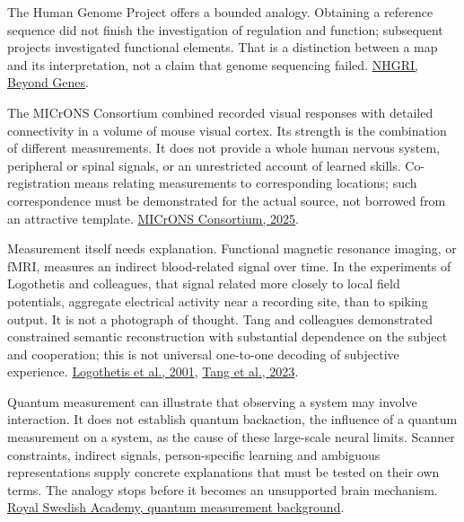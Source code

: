 The Human Genome Project offers a bounded analogy. Obtaining a reference sequence did not finish the investigation of regulation and function; subsequent projects investigated functional elements. That is a distinction between a map and its interpretation, not a claim that genome sequencing failed. \href{https://www.genome.gov/11009066/2003-release-scientists-venture-deeper-into-the-human-genome}{NHGRI, Beyond Genes}.\par

The MICrONS Consortium combined recorded visual responses with detailed connectivity in a volume of mouse visual cortex. Its strength is the combination of different measurements. It does not provide a whole human nervous system, peripheral or spinal signals, or an unrestricted account of learned skills. Co-registration means relating measurements to corresponding locations; such correspondence must be demonstrated for the actual source, not borrowed from an attractive template. \href{https://www.nature.com/articles/s41586-025-08790-w}{MICrONS Consortium, 2025}.\par

Measurement itself needs explanation. Functional magnetic resonance imaging, or fMRI, measures an indirect blood-related signal over time. In the experiments of Logothetis and colleagues, that signal related more closely to local field potentials, aggregate electrical activity near a recording site, than to spiking output. It is not a photograph of thought. Tang and colleagues demonstrated constrained semantic reconstruction with substantial dependence on the subject and cooperation; this is not universal one-to-one decoding of subjective experience. \href{https://pubmed.ncbi.nlm.nih.gov/11449264/}{Logothetis et al., 2001}, \href{https://www.nature.com/articles/s41593-023-01304-9}{Tang et al., 2023}.\par

Quantum measurement can illustrate that observing a system may involve interaction. It does not establish quantum backaction, the influence of a quantum measurement on a system, as the cause of these large-scale neural limits. Scanner constraints, indirect signals, person-specific learning and ambiguous representations supply concrete explanations that must be tested on their own terms. The analogy stops before it becomes an unsupported brain mechanism. \href{https://www.nobelprize.org/uploads/2018/06/advanced-physicsprize2012-1.pdf}{Royal Swedish Academy, quantum measurement background}.\par

